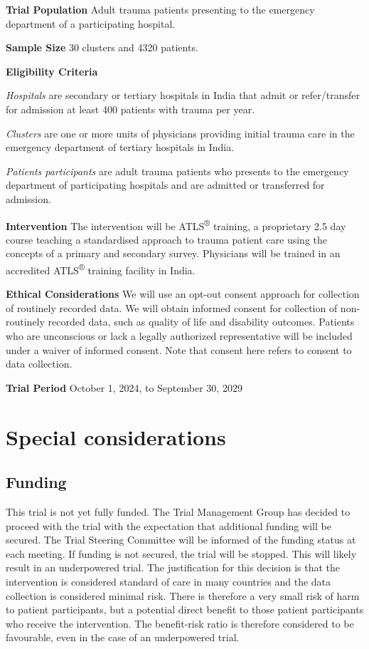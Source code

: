 \documentclass[
]{scrartcl}
\begin{document}
\textbf{Trial Population} Adult trauma patients presenting to the
emergency department of a participating hospital.

\textbf{Sample Size} 30 clusters and 4320 patients.

\textbf{Eligibility Criteria}

\emph{Hospitals} are secondary or tertiary hospitals in India that admit
or refer/transfer for admission at least 400 patients with trauma per
year.

\emph{Clusters} are one or more units of physicians providing initial
trauma care in the emergency department of tertiary hospitals in India.

\emph{Patients participants} are adult trauma patients who presents to
the emergency department of participating hospitals and are admitted or
transferred for admission.

\textbf{Intervention} The intervention will be ATLS\textsuperscript{®}
training, a proprietary 2.5 day course teaching a standardised approach
to trauma patient care using the concepts of a primary and secondary
survey. Physicians will be trained in an accredited
ATLS\textsuperscript{®} training facility in India.

\textbf{Ethical Considerations} We will use an opt-out consent approach
for collection of routinely recorded data. We will obtain informed
consent for collection of non-routinely recorded data, such as quality
of life and disability outcomes. Patients who are unconscious or lack a
legally authorized representative will be included under a waiver of
informed consent. Note that consent here refers to consent to data
collection.

\textbf{Trial Period} October 1, 2024, to September 30, 2029

\newpage{}

\hypertarget{special-considerations}{%
\section{Special considerations}\label{special-considerations}}

\hypertarget{funding}{%
\subsection{Funding}\label{funding}}

This trial is not yet fully funded. The Trial Management Group has
decided to proceed with the trial with the expectation that additional
funding will be secured. The Trial Steering Committee will be informed
of the funding status at each meeting. If funding is not secured, the
trial will be stopped. This will likely result in an underpowered trial.
The justification for this decision is that the intervention is
considered standard of care in many countries and the data collection is
considered minimal risk. There is therefore a very small risk of harm to
patient participants, but a potential direct benefit to those patient
participants who receive the intervention. The benefit-risk ratio is
therefore considered to be favourable, even in the case of an
underpowered trial.
\end{document}
